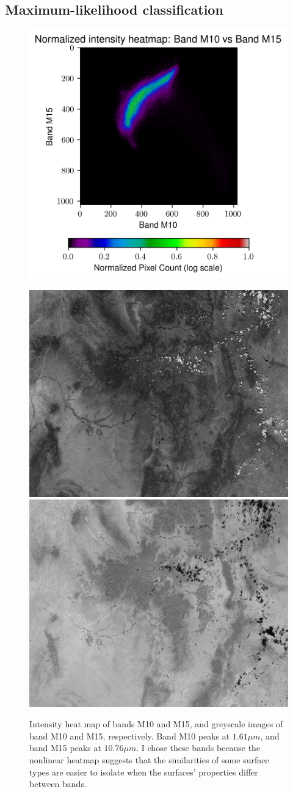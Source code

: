 \documentclass[12pt]{article}
\begin{document}
\clearpage

\subsection{Maximum-likelihood classification}

\begin{figure}[h!]
    \centering
    \includegraphics[width=.7\linewidth]{figures/p5/heatmap_M10+M15.png}

    \vspace{.2em}
    \includegraphics[width=.48\linewidth]{figures/p5/band_M10.png}
    \includegraphics[width=.48\linewidth]{figures/p5/band_M15.png}
    \caption{Intensity heat map of bands M10 and M15, and greyscale images of band M10 and M15, respectively. Band M10 peaks at $1.61\mu m$, and band M15 peaks at $10.76\mu m$. I chose these bands because the nonlinear heatmap suggests that the similarities of some surface types are easier to isolate when the surfaces' properties differ between bands.}
    \label{p5_inputs}
\end{figure}
\end{document}
